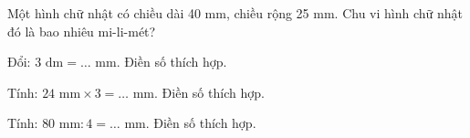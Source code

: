 \begin{ex}
Một hình chữ nhật có chiều dài 40 mm, chiều rộng 25 mm. Chu vi hình chữ nhật đó là bao nhiêu mi-li-mét?
\end{ex}

\begin{ex}
Đổi: $3\text{ dm} = \dots\text{ mm}$. Điền số thích hợp.
\end{ex}

\begin{ex}
Tính: $24\text{ mm} \times 3 = \dots\text{ mm}$. Điền số thích hợp.
\end{ex}

\begin{ex}
Tính: $80\text{ mm} : 4 = \dots\text{ mm}$. Điền số thích hợp.
\end{ex}
